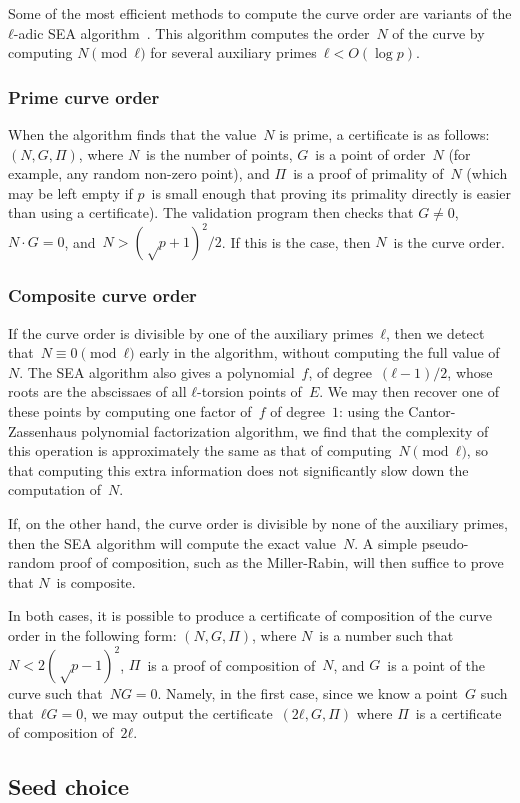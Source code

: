 \documentclass{article}
\begin{document}
Some of the most efficient methods to compute the curve order are
variants of the $ℓ$-adic SEA algorithm~\cite{mathcomp1985schoof,
jtnb1995schoof}.
This algorithm computes the order~$N$ of the curve
by computing $N \pmod{ℓ}$ for several
auxiliary primes~$ℓ < O(\log p)$.

\subsubsection{Prime curve order}
When the algorithm finds that the value~$N$ is prime,
a certificate is as follows: $(N, G, Π)$,
where $N$~is the number of points,
$G$~is a point of order~$N$ (for example, any random non-zero point),
and $Π$~is a proof of primality of~$N$
(which may be left empty if $p$~is small enough
that proving its primality directly is easier than using a certificate).
The validation program then checks that $G ≠ 0$,
$N · G = 0$, and~$N > (√p+1)^2 / 2$.
If this is the case, then $N$~is the curve order.

\subsubsection{Composite curve order}

If the curve order is divisible by one of the auxiliary primes~$ℓ$,
then we detect that~$N ≡ 0 \pmod{ℓ}$ early in the algorithm,
without computing the full value of~$N$.
The SEA algorithm also gives a polynomial~$f$, of degree~$(ℓ-1)/2$,
whose roots are the abscissaes of all $ℓ$-torsion points of~$E$.
We may then recover one of these points by
computing one factor of~$f$ of degree~$1$:
using the Cantor-Zassenhaus polynomial factorization algorithm,
we find that the complexity of this operation
is approximately the same as that of computing~$N \pmod{ℓ}$,
so that computing this extra information
does not significantly slow down the computation of~$N$.

\smallskip

If, on the other hand, the curve order is divisible
by none of the auxiliary primes,
then the SEA algorithm will compute the exact value~$N$.
A simple pseudo-random proof of composition,
such as the Miller-Rabin,
will then suffice to prove that $N$~is composite.

\smallskip

In both cases, it is possible to produce a certificate of composition
of the curve order in the following form: $(N, G, Π)$,
where $N$~is a number such that~$N < 2 (√p - 1)^2$,
$Π$~is a proof of composition of~$N$,
and $G$~is a point of the curve such that~$N G = 0$.
Namely, in the first case, since we know a point~$G$ such that~$ℓ G = 0$,
we may output the certificate~$(2 ℓ, G, Π)$
where $Π$~is a certificate of composition of~$2 ℓ$.


\subsection{Seed choice}




\end{document}
